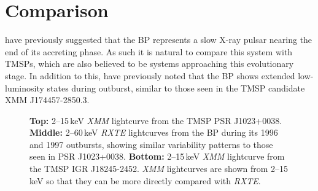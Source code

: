 \section{Comparison}

\par \citealp{Rappaport_BPHistory} have previously suggested that the BP represents a slow X-ray pulsar nearing the end of its accreting phase. As such it is natural to compare this system with TMSPs, which are also believed to be systems approaching this evolutionary stage. In addition to this, \citealp{Degenaar_174457} have previously noted that the BP shows extended low-luminosity states during outburst, similar to those seen in the TMSP candidate XMM J174457-2850.3.

\begin{figure}
 \centering
 \caption[Lightcurves from the Bursting Pulsar and from two TMSPs, showing similar patterns of variability.]{\textbf{Top:} 2--15\,keV \textit{XMM} lightcurve from the TMSP PSR J1023+0038. \textbf{Middle:} 2--60\,keV \textit{RXTE} lightcurves from the BP during its 1996 and 1997 outbursts, showing similar variability patterns to those seen in PSR J1023+0038. \textbf{Bottom:} 2--15\,keV \textit{XMM} lightcurve from the TMSP IGR J18245-2452. \textit{XMM} lightcurves are shown from 2--15\,keV so that they can be more directly compared with \textit{RXTE}.}
 \label{fig:lcs}
\end{figure}

